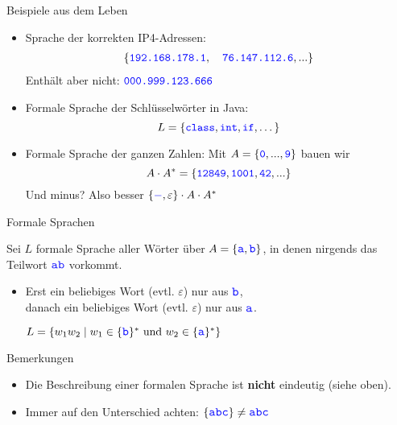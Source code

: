 \begin{frame}{Beispiele aus dem Leben}
	\begin{itemize}
		\item Sprache der korrekten IP4-Adressen: \pause
		\begin{align*}
		\left\{\hbox{\textcolor{blue}{\texttt{192.168.178.1}}}, \quad 
			\hbox{\textcolor{blue}{\texttt{76.147.112.6}}}, ... \right\}
		\end{align*} 
		\pause Enthält aber nicht: $\hbox{\textcolor{blue}{\texttt{000.999.123.666}}}$ \pause
		\item Formale Sprache der Schlüsselwörter in Java: $$L = \{ \hbox{\textcolor{blue}{\texttt{class}}}, \hbox{\textcolor{blue}{\texttt{int}}} , \hbox{\textcolor{blue}{\texttt{if}}}, \dots \}$$ \pause
		\item Formale Sprache der ganzen Zahlen: Mit $A = \{\hbox{\textcolor{blue}{\texttt{0}}}, ..., \hbox{\textcolor{blue}{\texttt{9}}}\}$ bauen wir
		\pause $$A \cdot A^* = \{\hbox{\textcolor{blue}{\texttt{12849}}}, \hbox{\textcolor{blue}{\texttt{1001}}}, \hbox{\textcolor{blue}{\texttt{42}}}, ...\}$$ 
		\pause Und minus? Also besser $ \{ \hbox{\textcolor{blue}{$\mathtt{-}$}}, \varepsilon \} \cdot A \cdot A^*$
	\end{itemize}
\end{frame}

\begin{frame}{Formale Sprachen}
	
	\begin{Beispiel}
		Sei $L$ formale Sprache aller Wörter über $A=\{\literal{a},\literal{b}\}$, in denen nirgends das Teilwort $\literal{ab}$ vorkommt.
		\begin{itemize}
			\pause
			\implitem $L=\{\literal{a},\literal{b}\}^*
			\setminus \set{w_1 \cdot \literal{ab} \cdot w_2 \mid w_1,w_2\in
			\{\literal{a},\literal{b}\}^* }$
			
			\pause
			\item Erst ein beliebiges Wort (evtl. $\varepsilon$) nur aus $\literal{b}$,\\
			danach ein beliebiges Wort (evtl. $\varepsilon$) nur aus $\literal{a}$.
			
			\pause
			\implitem $L=\set{w_1w_2 \mid w_1\in 
			\{\literal{b}\}^*  \text{ und }  w_2\in \{\literal{a}\}^* }$
		\end{itemize}
	\end{Beispiel}
	
	\begin{block}{Bemerkungen}
		\begin{itemize}
			\item Die Beschreibung einer formalen Sprache ist \textbf{nicht} eindeutig (siehe oben).
			\pause
			\item Immer auf den Unterschied achten: $\{\literal{abc} \} \neq \literal{abc} $
		\end{itemize}
	\end{block}
\end{frame}



